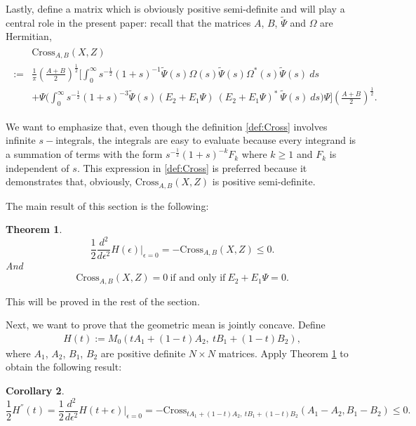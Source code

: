 \documentclass{article}
\numberwithin{equation}{section}
\newtheorem{theorem}{Theorem}[section]
\newtheorem{corollary}[theorem]{Corollary}
\begin{document}
Lastly, define a matrix which is obviously positive semi-definite and will play a central role in the present paper: recall that the matrices $A$, $B$, $\widetilde{\Psi}$ and $\Omega$ are Hermitian,
\begin{align}\label{def:Cross}
\begin{split}
& \text{Cross}_{A,B}( X, Z) \\
:=&\frac{1}{\pi}(\frac{A+B}{2})^{\frac{1}{2}}\Bigg[\int_{0}^{\infty} s^{-\frac{1}{2}}(1+s)^{-1}\widetilde{\Psi}(s)\Omega(s) \widetilde{\Psi}(s) \Omega^{*}(s) \widetilde{\Psi}(s)\ ds\\
&+\Psi\Big(\int_{0}^{\infty} s^{-\frac{1}{2}}(1+s)^{-3}\widetilde{\Psi}(s)(E_2+E_1\Psi)\ (E_2+E_1\Psi)^{*}\  \widetilde{\Psi}(s)\ ds \Big)\Psi\Bigg](\frac{A+B}{2})^{\frac{1}{2}}.
\end{split}
\end{align}


We want to emphasize that, even though the definition \eqref{def:Cross} involves infinite $s-$integrals, the integrals are easy to evaluate because every integrand is a summation of terms with the form $s^{-\frac{1}{2}}(1+s)^{-k} F_k $ where $k\geq 1$ and $F_k$ is independent of $s$. This expression in \eqref{def:Cross} is preferred because it demonstrates that, obviously, $\text{Cross}_{A, B}(X, Z)$ is positive semi-definite.
 
The main result of this section is the following:
\begin{theorem}\label{THM:secondOrder}
\begin{equation}\label{eq:Hvare}
\frac{1}{2}\frac{d^2}{d\epsilon^2}H(\epsilon)\Big|_{\epsilon=0}=-\text{Cross}_{A,B}(X,Z)\leq 0.
\end{equation}
And
\begin{equation}\label{eq:iff}
  \text{Cross}_{A,B}(X,Z)= 0 \ \text{if and only if}\ 
E_2 + E_1 \Psi=0.
\end{equation}
\end{theorem}
This will be proved in the rest of the section.

Next, we want to prove that the geometric mean is jointly concave. Define 
\begin{align}
  H(t):=M_0(tA_1+(1-t)A_2, \ tB_1+(1-t)B_2),
\end{align} where $A_1$, $A_2$, $B_1$, $B_2$ are positive definite $N\times N$ matrices.
Apply Theorem \ref{THM:secondOrder} to obtain the following result:
\begin{corollary}
\begin{equation}
  \frac{1}{2} H^{''}(t)=\frac{1}{2}\frac{d^2}{d\epsilon^2}H(t+\epsilon)\Big|_{\epsilon=0}=-\text{Cross}_{tA_1+(1-t)A_2,\ tB_1+(1-t)B_2}(A_1-A_2, B_1-B_2)\leq 0.
\end{equation}
\end{corollary}
\end{document}
